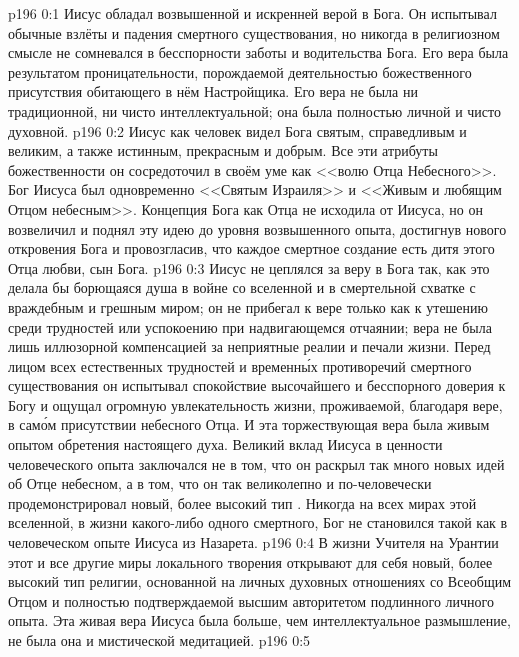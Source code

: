 \author{Промежуточные создания}
\vs p196 0:1 Иисус обладал возвышенной и искренней верой в Бога. Он испытывал обычные взлёты и падения смертного существования, но никогда в религиозном смысле не сомневался в бесспорности заботы и водительства Бога. Его вера была результатом проницательности, порождаемой деятельностью божественного присутствия обитающего в нём Настройщика. Его вера не была ни традиционной, ни чисто интеллектуальной; она была полностью личной и чисто духовной.
\vs p196 0:2 Иисус как человек видел Бога святым, справедливым и великим, а также истинным, прекрасным и добрым. Все эти атрибуты божественности он сосредоточил в своём уме как <<волю Отца Небесного>>. Бог Иисуса был одновременно <<Святым Израиля>> и <<Живым и любящим Отцом небесным>>. Концепция Бога как Отца не исходила от Иисуса, но он возвеличил и поднял эту идею до уровня возвышенного опыта, достигнув нового откровения Бога и провозгласив, что каждое смертное создание есть дитя этого Отца любви, сын Бога.
\vs p196 0:3 Иисус не цеплялся за веру в Бога так, как это делала бы борющаяся душа в войне со вселенной и в смертельной схватке с враждебным и грешным миром; он не прибегал к вере только как к утешению среди трудностей или успокоению при надвигающемся отчаянии; вера не была лишь иллюзорной компенсацией за неприятные реалии и печали жизни. Перед лицом всех естественных трудностей и временн\'ых противоречий смертного существования он испытывал спокойствие высочайшего и бесспорного доверия к Богу и ощущал огромную увлекательность жизни, проживаемой, благодаря вере, в сам\'ом присутствии небесного Отца. И эта торжествующая вера была живым опытом обретения настоящего духа. Великий вклад Иисуса в ценности человеческого опыта заключался не в том, что он раскрыл так много новых идей об Отце небесном, а в том, что он так великолепно и по\hyp{}человечески продемонстрировал новый, более высокий тип . Никогда на всех мирах этой вселенной, в жизни какого\hyp{}либо одного смертного, Бог не становился такой  как в человеческом опыте Иисуса из Назарета.
\vs p196 0:4 В жизни Учителя на Урантии этот и все другие миры локального творения открывают для себя новый, более высокий тип религии, основанной на личных духовных отношениях со Всеобщим Отцом и полностью подтверждаемой высшим авторитетом подлинного личного опыта. Эта живая вера Иисуса была больше, чем интеллектуальное размышление, не была она и мистической медитацией.
\vs p196 0:5 
